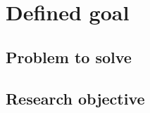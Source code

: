 \section{Defined goal}\label{sec:defined-goal}

\subsection{Problem to solve}\label{subsec:framework-structure}


\subsection{Research objective}\label{subsec:attack-components}

